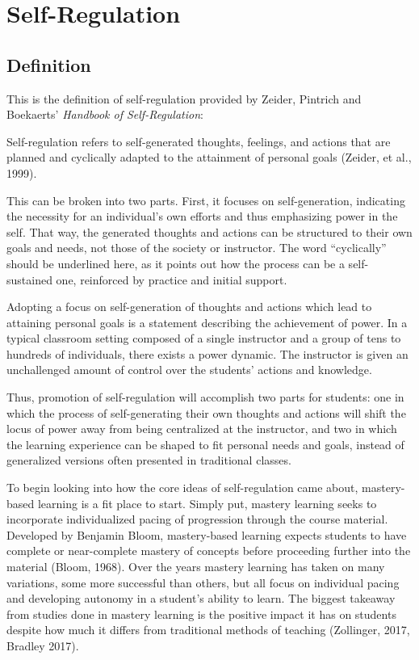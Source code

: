 \chapter{Self-Regulation}

\section{Definition}
This is the definition of self-regulation provided by Zeider, Pintrich and Boekaerts' \emph{Handbook of Self-Regulation}:
\begin{displayquote}
  Self-regulation refers to self-generated thoughts, feelings, and actions that are planned and cyclically adapted to the attainment of personal goals (Zeider, et al., 1999).
\end{displayquote}

This can be broken into two parts. First, it focuses on self-generation, indicating the necessity for an individual's own efforts and thus emphasizing power in the self. That way, the generated thoughts and actions can be structured to their own goals and needs, not those of the society or instructor. The word ``cyclically'' should be underlined here, as it points out how the process can be a self-sustained one, reinforced by practice and initial support.

Adopting a focus on self-generation of thoughts and actions which lead to attaining personal goals is a statement describing the achievement of power. In a typical classroom setting composed of a single instructor and a group of tens to hundreds of individuals, there exists a power dynamic. The instructor is given an unchallenged amount of control over the students' actions and knowledge.

Thus, promotion of self-regulation will accomplish two parts for students: one in which the process of self-generating their own thoughts and actions will shift the locus of power away from being centralized at the instructor, and two in which the learning experience can be shaped to fit personal needs and goals, instead of generalized versions often presented in traditional classes.

To begin looking into how the core ideas of self-regulation came about, mastery-based learning is a fit place to start. Simply put, mastery learning seeks to incorporate individualized pacing of progression through the course material. Developed by Benjamin Bloom, mastery-based learning expects students to have complete or near-complete mastery of concepts before proceeding further into the material (Bloom, 1968). Over the years mastery learning has taken on many variations, some more successful than others, but all focus on individual pacing and developing autonomy in a student's ability to learn. The biggest takeaway from studies done in mastery learning is the positive impact it has on students despite how much it differs from traditional methods of teaching (Zollinger, 2017, Bradley 2017).


